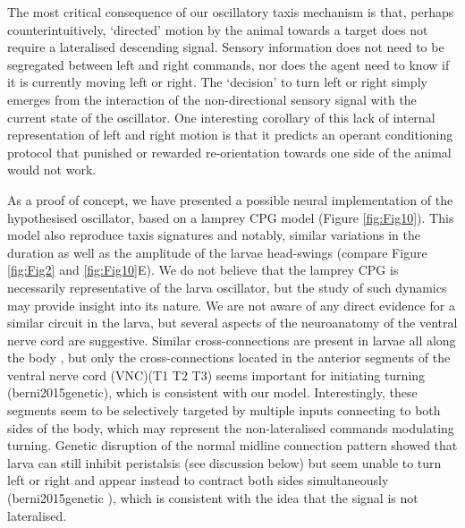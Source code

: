 \documentclass[10pt,a4paper]{article}
\begin{document}
The most critical consequence of our oscillatory taxis mechanism is that, perhaps counterintuitively, ‘directed’ motion by the animal towards a target does not require a lateralised descending signal. Sensory information does not need to be segregated between left and right commands, nor does the agent need to know if it is currently moving left or right. The ‘decision’ to turn left or right simply emerges from the interaction of the non-directional sensory signal with the current state of the oscillator. 
One interesting corollary of this lack of internal representation of left and right motion is that it predicts an operant conditioning protocol that punished or rewarded re-orientation towards one side of the animal would not work.

As a proof of concept, we have presented a possible neural implementation of the hypothesised oscillator, based on a lamprey CPG model (Figure \ref{fig:Fig10}). This model also reproduce taxis signatures and notably, similar variations in the duration as well as the amplitude of the larvae head-swings (compare Figure \ref{fig:Fig2} and \ref{fig:Fig10}E). We do not believe that the lamprey CPG is necessarily representative of the larva oscillator, but the study of such dynamics may provide insight into its nature. We are not aware of any direct evidence for a similar circuit in the larva, but several aspects of the neuroanatomy of the ventral nerve cord are suggestive. Similar cross-connections are present in larvae all along the body , but only the cross-connections located in the anterior segments of the ventral nerve cord (VNC)(T1 T2 T3) seems important for initiating turning (berni2015genetic), which is consistent with our model. Interestingly, these segments seem to be selectively targeted by multiple inputs connecting to both sides of the body, which may represent the non-lateralised commands modulating turning. Genetic disruption of the normal midline connection pattern showed that larva can still inhibit peristalsis (see discussion below) but seem unable to turn left or right and appear instead to contract both sides simultaneously (berni2015genetic ), which is consistent with the idea that the signal is not lateralised. 
\end{document}
